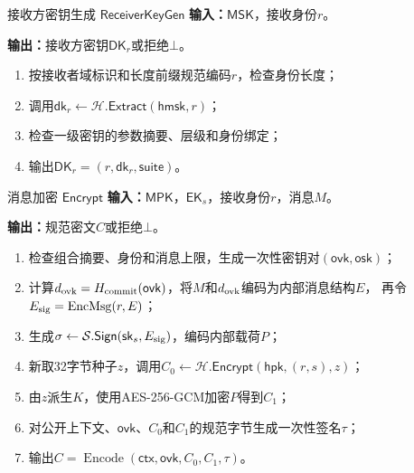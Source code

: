 \begin{ibmealgorithm}{接收方密钥生成 $\mathsf{ReceiverKeyGen}$}
\label{alg:receiver-keygen}
\textbf{输入：}$\mathsf{MSK}$，接收身份$r$。\par
\textbf{输出：}接收方密钥$\mathsf{DK}_r$或拒绝$\bot$。
\begin{enumerate}
  \item 按接收者域标识和长度前缀规范编码$r$，检查身份长度；
  \item 调用$\mathsf{dk}_r\leftarrow\mathcal H.\mathsf{Extract}(\mathsf{hmsk},r)$；
  \item 检查一级密钥的参数摘要、层级和身份绑定；
  \item 输出$\mathsf{DK}_r=(r,\mathsf{dk}_r,\mathsf{suite})$。
\end{enumerate}
\end{ibmealgorithm}

\begin{ibmealgorithm}{消息加密 $\mathsf{Encrypt}$}
\label{alg:encrypt}
\textbf{输入：}$\mathsf{MPK}$，$\mathsf{EK}_s$，接收身份$r$，消息$M$。\par
\textbf{输出：}规范密文$C$或拒绝$\bot$。
\begin{enumerate}
  \item 检查组合摘要、身份和消息上限，生成一次性密钥对$(\mathsf{ovk},\mathsf{osk})$；
  \item 计算$d_{\rm ovk}=H_{\rm commit}(\mathsf{ovk})$，将$M$和$d_{\rm ovk}$编码为内部消息结构$E$，
        再令$E_{\rm sig}=\operatorname{EncMsg}(r,E)$；
  \item 生成$\sigma\leftarrow\mathcal S.\mathsf{Sign}(\mathsf{sk}_s,E_{\rm sig})$，编码内部载荷$P$；
  \item 新取32字节种子$z$，调用$C_0\leftarrow\mathcal H.\mathsf{Encrypt}
        (\mathsf{hpk},(r,s),z)$；
  \item 由$z$派生$K$，使用AES-256-GCM加密$P$得到$C_1$；
  \item 对公开上下文、$\mathsf{ovk}$、$C_0$和$C_1$的规范字节生成一次性签名$\tau$；
  \item 输出$C=\operatorname{Encode}(\mathsf{ctx},\mathsf{ovk},C_0,C_1,\tau)$。
\end{enumerate}
\end{ibmealgorithm}

